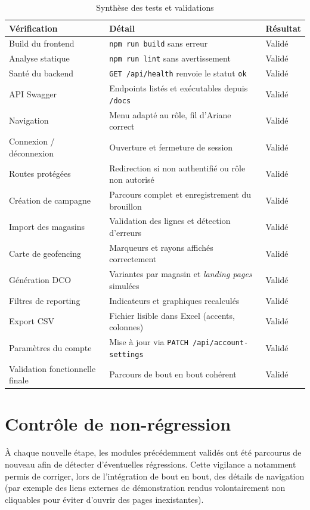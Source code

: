 \begin{table}[H]
\centering
\caption{Synthèse des tests et validations}
\label{tab:tests}
\small
\begin{tabularx}{\textwidth}{@{}p{5.2cm}L p{2cm}@{}}
\toprule
\textbf{Vérification} & \textbf{Détail} & \textbf{Résultat} \\
\midrule
Build du frontend & \texttt{npm run build} sans erreur & Validé \\
Analyse statique & \texttt{npm run lint} sans avertissement & Validé \\
Santé du backend & \texttt{GET /api/health} renvoie le statut \texttt{ok} & Validé \\
API Swagger & Endpoints listés et exécutables depuis \texttt{/docs} & Validé \\
Navigation & Menu adapté au rôle, fil d'Ariane correct & Validé \\
Connexion / déconnexion & Ouverture et fermeture de session & Validé \\
Routes protégées & Redirection si non authentifié ou rôle non autorisé & Validé \\
Création de campagne & Parcours complet et enregistrement du brouillon & Validé \\
Import des magasins & Validation des lignes et détection d'erreurs & Validé \\
Carte de geofencing & Marqueurs et rayons affichés correctement & Validé \\
Génération DCO & Variantes par magasin et \emph{landing pages} simulées & Validé \\
Filtres de reporting & Indicateurs et graphiques recalculés & Validé \\
Export CSV & Fichier lisible dans Excel (accents, colonnes) & Validé \\
Paramètres du compte & Mise à jour via \texttt{PATCH /api/account-settings} & Validé \\
Validation fonctionnelle finale & Parcours de bout en bout cohérent & Validé \\
\bottomrule
\end{tabularx}
\end{table}

\section{Contrôle de non-régression}

À chaque nouvelle étape, les modules précédemment validés ont été parcourus
de nouveau afin de détecter d'éventuelles régressions. Cette vigilance a
notamment permis de corriger, lors de l'intégration de bout en bout, des
détails de navigation (par exemple des liens externes de démonstration rendus
volontairement non cliquables pour éviter d'ouvrir des pages inexistantes).

